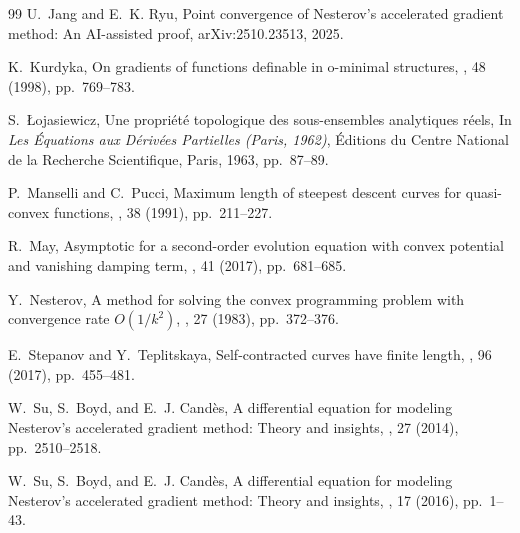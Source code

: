 \documentclass{article}
\theoremstyle{remark}
\begin{document}
\begin{thebibliography}{99}
{\sc U.~Jang and E.~K. Ryu},
\newblock Point convergence of {N}esterov's accelerated gradient method: An {AI}-assisted proof,
 arXiv:2510.23513, 2025.

{\sc K.~Kurdyka},
\newblock On gradients of functions definable in o-minimal structures,
, 48 (1998), pp.~769--783.

{\sc S.~{\L}ojasiewicz},
\newblock Une propri\'et\'e topologique des sous-ensembles analytiques r\'eels,
\newblock In {\em Les \'Equations aux D\'eriv\'ees Partielles (Paris, 1962)}, \'Editions du Centre National de la Recherche Scientifique, Paris, 1963, pp.~87--89.

{\sc P.~Manselli and C.~Pucci},
\newblock Maximum length of steepest descent curves for quasi-convex functions,
, 38 (1991), pp.~211--227.

{\sc R.~May},
\newblock Asymptotic for a second-order evolution equation with convex potential and vanishing damping term,
, 41 (2017), pp.~681--685.

{\sc Y.~Nesterov},
\newblock A method for solving the convex programming problem with convergence rate $O(1/k^2)$,
, 27 (1983), pp.~372--376.

{\sc E.~Stepanov and Y.~Teplitskaya},
\newblock Self-contracted curves have finite length,
, 96 (2017), pp.~455--481.

{\sc W.~Su, S.~Boyd, and E.~J. Cand\`es},
\newblock A differential equation for modeling {N}esterov's accelerated gradient method: Theory and insights,
, 27 (2014), pp.~2510--2518.

{\sc W.~Su, S.~Boyd, and E.~J. Cand\`es},
\newblock A differential equation for modeling {N}esterov's accelerated gradient method: Theory and insights,
, 17 (2016), pp.~1--43.

\end{thebibliography}
\end{document}

